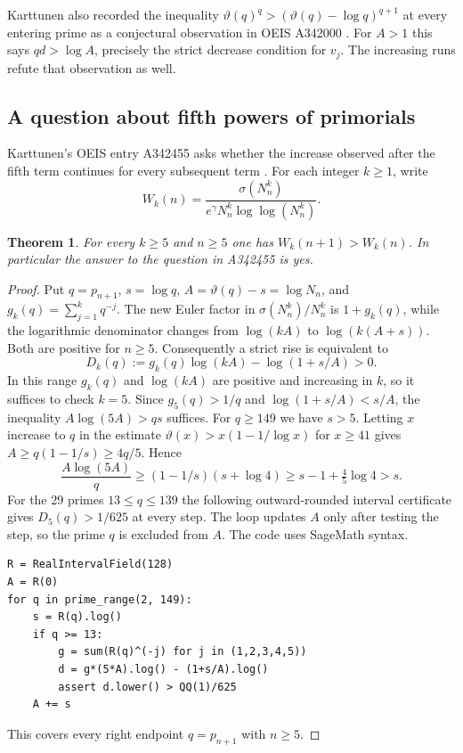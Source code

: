 \documentclass[11pt,a4paper]{article}
\newtheorem{theorem}{Theorem}[section]
\begin{document}
Karttunen also recorded the inequality
$\vartheta(q)^q> (\vartheta(q)-\log q)^{q+1}$ at every entering prime as
a conjectural observation in OEIS A342000 \cite{oeis1}. For $A>1$
this says $q d>\log A$, precisely the strict decrease condition for
$v_j$. The increasing runs refute that observation as well.

\subsection{A question about fifth powers of primorials}
Karttunen's OEIS entry A342455 asks whether the increase observed after the fifth
term continues for every subsequent term \cite{oeis5}.  For each integer $k\ge1$,
write
\[
 W_k(n)=\frac{\sigma(N_n^k)}
 {e^\gamma N_n^k\log\log(N_n^k)} .
\]

\begin{theorem}\label{thm:fifth}
For every $k\ge5$ and $n\ge5$ one has $W_k(n+1)>W_k(n)$.
In particular the answer to the question in A342455 is yes.
\end{theorem}
\begin{proof}
Put $q=p_{n+1}$, $s=\log q$, $A=\vartheta(q)-s=\log N_n$, and
$g_k(q)=\sum_{j=1}^k q^{-j}$.
The new Euler factor in $\sigma(N_n^k)/N_n^k$ is $1+g_k(q)$,
while the logarithmic denominator changes from $\log(kA)$ to
$\log(k(A+s))$.  Both are positive for $n\ge5$.  Consequently a strict rise
is equivalent to
\[
 D_k(q):=g_k(q)\log(kA)-\log(1+s/A)>0.
\]
In this range $g_k(q)$ and $\log(kA)$ are positive and increasing in $k$,
so it suffices to check $k=5$.
Since $g_5(q)>1/q$ and $\log(1+s/A)<s/A$,
the inequality $A\log(5A)>qs$ suffices.
For $q\ge149$ we have $s>5$.  Letting $x$ increase to $q$ in
the estimate $\vartheta(x)>x(1-1/\log x)$ for $x\ge41$
\cite[(3.16)]{rs62} gives $A\ge q(1-1/s)\ge4q/5$.  Hence
\[
 \frac{A\log(5A)}q\ge(1-1/s)(s+\log4)
 \ge s-1+\tfrac45\log4>s.
\]
For the 29 primes $13\le q\le139$ the following outward-rounded
interval certificate gives $D_5(q)>1/625$ at every step.
The loop updates $A$ only after testing the step, so the prime $q$ is
excluded from $A$.  The code uses SageMath syntax.
\begin{verbatim}
R = RealIntervalField(128)
A = R(0)
for q in prime_range(2, 149):
    s = R(q).log()
    if q >= 13:
        g = sum(R(q)^(-j) for j in (1,2,3,4,5))
        d = g*(5*A).log() - (1+s/A).log()
        assert d.lower() > QQ(1)/625
    A += s
\end{verbatim}
This covers every right endpoint $q=p_{n+1}$ with $n\ge5$.
\end{proof}
\end{document}
